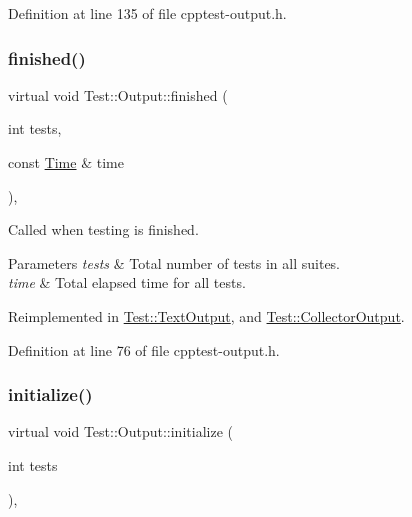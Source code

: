 Definition at line 135 of file cpptest-\/output.\+h.

\mbox{\label{class_test_1_1_output_aeff8af8326a8c54a38199f76837f860a}} 
\subsubsection{\texorpdfstring{finished()}{finished()}}
{\footnotesize\ttfamily virtual void Test\+::\+Output\+::finished (\begin{DoxyParamCaption}\item[{int}]{tests,  }\item[{const \mbox{\hyperlink{class_test_1_1_time}{Time}} \&}]{time }\end{DoxyParamCaption})\hspace{0.3cm}{\ttfamily [inline]}, {\ttfamily [virtual]}}

Called when testing is finished.


\begin{DoxyParams}{Parameters}
{\em tests} & Total number of tests in all suites. \\
\hline
{\em time} & Total elapsed time for all tests. \\
\hline
\end{DoxyParams}


Reimplemented in \mbox{\hyperlink{class_test_1_1_text_output_a9dcf13d9714a2774230386ef3215b701}{Test\+::\+Text\+Output}}, and \mbox{\hyperlink{class_test_1_1_collector_output_ad1a7502a31c58d93f0d88d7a679ab24d}{Test\+::\+Collector\+Output}}.



Definition at line 76 of file cpptest-\/output.\+h.

\mbox{\label{class_test_1_1_output_aa66480875d088befc6c23ecfd1107cc1}} 
\subsubsection{\texorpdfstring{initialize()}{initialize()}}
{\footnotesize\ttfamily virtual void Test\+::\+Output\+::initialize (\begin{DoxyParamCaption}\item[{int}]{tests }\end{DoxyParamCaption})\hspace{0.3cm}{\ttfamily [inline]}, {\ttfamily [virtual]}}

